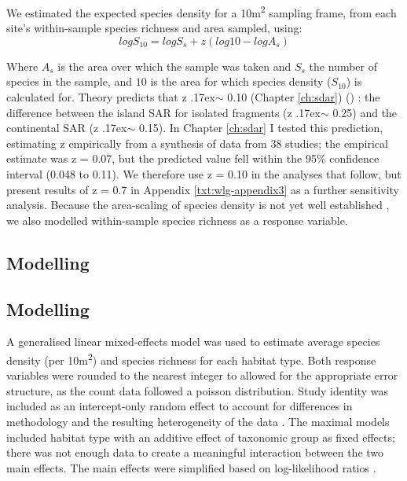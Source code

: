 We estimated the expected species density for a 10m\textsuperscript{2} sampling frame, from each site's within-sample species richness and area sampled, using: 
\begin{equation}
log S_{10} = log S_s + z(log 10 - log A_s)
\end{equation}


Where $A_s$ is the area over which the sample was taken and $S_s$ the number of species in the sample, and $10$ is the area for which species density ($S_{10}$) is calculated for. Theory predicts that z {\raise.17ex\hbox{$\scriptstyle\sim$}} 0.10 
\ifappendixStyle %
(Chapter \ref{ch:sdar})%
\else
(\citealt{Phillips:2015sdar})
\fi
: the difference between the island SAR for isolated fragments (z {\raise.17ex\hbox{$\scriptstyle\sim$}} 0.25) and the continental SAR (z {\raise.17ex\hbox{$\scriptstyle\sim$}} 0.15). 
\ifappendixStyle %
In Chapter \ref{ch:sdar} I %
\else
\cite{Phillips:2015sdar} 
\fi
tested this prediction, estimating z empirically from a synthesis of data from 38 studies; the empirical estimate was z = 0.07, but the predicted value fell within the 95\% confidence interval (0.048 to 0.11). We therefore use z = 0.10 in the analyses that follow, but present results of z = 0.7 in Appendix \ref{txt:wlg-appendix3} as a further sensitivity analysis. Because the area-scaling of species density is not yet well established \citep[e.g.][]{Giladi:2014bio}, we also modelled within-sample species richness as a response variable.

\ifappendixStyle %
\subsection{Modelling}%
\else
\subsection*{Modelling}
\fi

A generalised linear mixed-effects model was used to estimate average species density (per 10m\textsuperscript{2}) and species richness for each habitat type. Both response variables were rounded to the nearest integer to allowed for the appropriate error structure, as the count data followed a poisson distribution. Study identity was included as an intercept-only random effect to account for differences in methodology and the resulting heterogeneity of the data \citep{Zuur:2009me}. The maximal models included habitat type with an additive effect of taxonomic group as fixed effects; there was not enough data to create a meaningful interaction between the two main effects. The main effects were simplified based on log-likelihood ratios \citep{Zuur:2009me,Crawley:2012r}.


